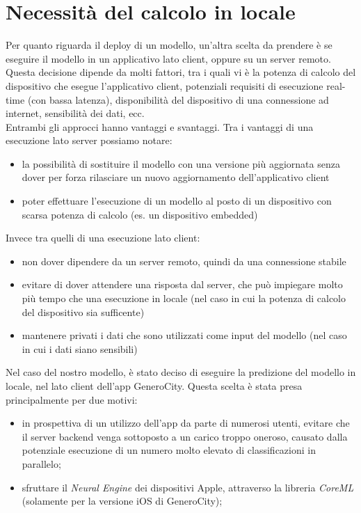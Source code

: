 \section{Necessità del calcolo in locale}

Per quanto riguarda il deploy di un modello, un'altra scelta da prendere è se 
eseguire il modello in un applicativo lato client, oppure su un server remoto.
Questa decisione dipende da molti fattori, tra i quali vi è la potenza di calcolo
del dispositivo che esegue l'applicativo client, potenziali requisiti di esecuzione
real-time (con bassa latenza), disponibilità del dispositivo di una connessione 
ad internet, sensibilità dei dati, ecc.\\
Entrambi gli approcci hanno vantaggi e svantaggi. Tra i vantaggi di una
 esecuzione lato server possiamo notare: 
\begin{itemize}
    \item la possibilità di sostituire il modello con una versione più aggiornata
    senza dover per forza rilasciare un nuovo aggiornamento dell'applicativo client
    \item poter effettuare l'esecuzione di un modello al posto di un dispositivo
   	con scarsa potenza di calcolo (es. un dispositivo embedded)
\end{itemize}
Invece tra quelli di una esecuzione lato client:
\begin{itemize}
    \item non dover dipendere da un server remoto, quindi da una connessione 
    stabile 
    \item evitare di dover attendere una risposta dal server, che può impiegare
    molto più tempo che una esecuzione in locale (nel caso in cui la potenza di
    calcolo del dispositivo sia sufficente)
    \item mantenere privati i dati che sono utilizzati come input del modello
    (nel caso in cui i dati siano sensibili)
\end{itemize}
Nel caso del nostro modello, è stato deciso di eseguire la predizione del modello
in locale, nel lato client dell'app GeneroCity. Questa scelta è stata presa 
principalmente per due motivi:
\begin{itemize}
    \item in prospettiva di un utilizzo dell'app da parte di numerosi utenti,
    evitare che il server backend venga sottoposto a un carico troppo oneroso,
    causato dalla potenziale esecuzione di un numero molto elevato di 
    classificazioni in parallelo;
    \item sfruttare il \emph{Neural Engine} dei dispositivi Apple, attraverso la 
    libreria \emph{CoreML} (solamente per la versione iOS di GeneroCity);
\end{itemize}

